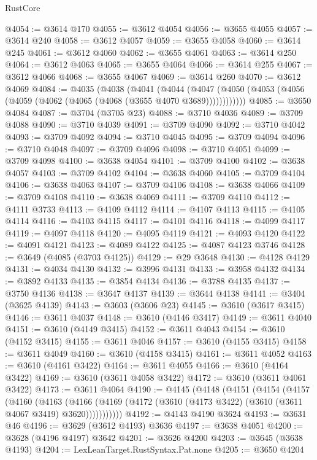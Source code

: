 \begin{lexlean}{RustCore}
\begin{coremodule}
@4054 := @3614 @170
@4055 := @3612 @4054
@4056 := @3655 @4055
@4057 := @3614 @240
@4058 := @3612 @4057
@4059 := @3655 @4058
@4060 := @3614 @245
@4061 := @3612 @4060
@4062 := @3655 @4061
@4063 := @3614 @250
@4064 := @3612 @4063
@4065 := @3655 @4064
@4066 := @3614 @255
@4067 := @3612 @4066
@4068 := @3655 @4067
@4069 := @3614 @260
@4070 := @3612 @4069
@4084 := @4035
    (@4038
      (@4041
        (@4044
          (@4047 (@4050 (@4053 (@4056 (@4059 (@4062 (@4065 (@4068 (@3655 @4070 @3689))))))))))))
@4085 := @3650 @4084
@4087 := @3704 (@3705 @23)
@4088 := @3710 @4036
@4089 := @3709 @4088
@4090 := @3710 @4039
@4091 := @3709 @4090
@4092 := @3710 @4042
@4093 := @3709 @4092
@4094 := @3710 @4045
@4095 := @3709 @4094
@4096 := @3710 @4048
@4097 := @3709 @4096
@4098 := @3710 @4051
@4099 := @3709 @4098
@4100 := @3638 @4054
@4101 := @3709 @4100
@4102 := @3638 @4057
@4103 := @3709 @4102
@4104 := @3638 @4060
@4105 := @3709 @4104
@4106 := @3638 @4063
@4107 := @3709 @4106
@4108 := @3638 @4066
@4109 := @3709 @4108
@4110 := @3638 @4069
@4111 := @3709 @4110
@4112 := @4111 @3733
@4113 := @4109 @4112
@4114 := @4107 @4113
@4115 := @4105 @4114
@4116 := @4103 @4115
@4117 := @4101 @4116
@4118 := @4099 @4117
@4119 := @4097 @4118
@4120 := @4095 @4119
@4121 := @4093 @4120
@4122 := @4091 @4121
@4123 := @4089 @4122
@4125 := @4087 @4123 @3746
@4128 := @3649 (@4085 (@3703 @4125))
@4129 := @29 @3648
@4130 := @4128 @4129
@4131 := @4034 @4130
@4132 := @3996 @4131
@4133 := @3958 @4132
@4134 := @3892 @4133
@4135 := @3854 @4134
@4136 := @3788 @4135
@4137 := @3750 @4136
@4138 := @3647 @4137
@4139 := @3644 @4138
@4141 := @3404 (@3625 @4139)
@4143 := @3603 (@3606 @23)
@4145 := @3610 (@3617 @3415)
@4146 := @3611 @4037
@4148 := @3610 (@4146 @3417)
@4149 := @3611 @4040
@4151 := @3610 (@4149 @3415)
@4152 := @3611 @4043
@4154 := @3610 (@4152 @3415)
@4155 := @3611 @4046
@4157 := @3610 (@4155 @3415)
@4158 := @3611 @4049
@4160 := @3610 (@4158 @3415)
@4161 := @3611 @4052
@4163 := @3610 (@4161 @3422)
@4164 := @3611 @4055
@4166 := @3610 (@4164 @3422)
@4169 := @3610 (@3611 @4058 @3422)
@4172 := @3610 (@3611 @4061 @3422)
@4173 := @3611 @4064
@4190 := @4145
    (@4148
      (@4151
        (@4154
          (@4157
            (@4160
              (@4163
                (@4166
                  (@4169 (@4172 (@3610 (@4173 @3422) (@3610 (@3611 @4067 @3419) @3620)))))))))))
@4192 := @4143 @4190 @3624
@4193 := @3631 @46
@4196 := @3629 (@3612 @4193) @3636
@4197 := @3638 @4051
@4200 := @3628 (@4196 @4197) @3642
@4201 := @3626 @4200
@4203 := @3645 (@3638 @4193)
@4204 := LexLeanTarget.RustSyntax.Pat.none
@4205 := @3650 @4204

\end{coremodule}
\end{lexlean}
